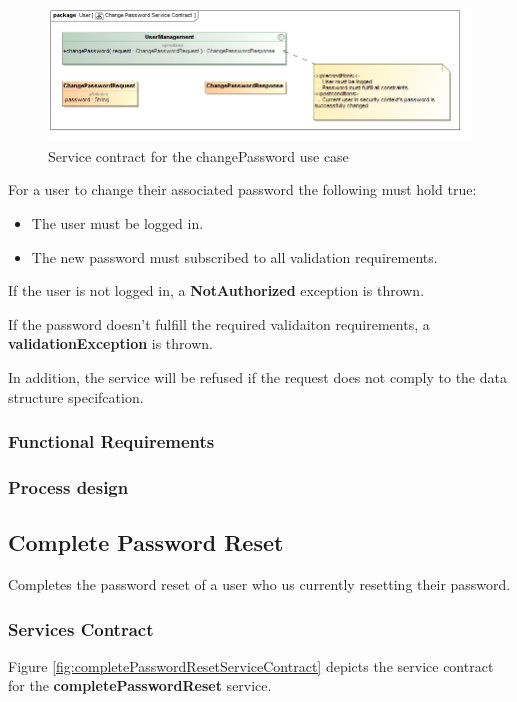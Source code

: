 \begin{figure}[H]
  \begin{center}
  \includegraphics[scale=0.55]{../Diagrams and Charts/Users/Change Password Service Contract.jpg}
  \caption{Service contract for the changePassword use case}
  \end{center}
  \label{fig:changePasswordServicesContract}
\end{figure}

For a user to change their associated password the following must hold true:
\begin{itemize}
	\item The user must be logged in.
	\item The new password must subscribed to all validation requirements.
\end{itemize}

If the user is not logged in, a \textbf{NotAuthorized} exception is thrown.

If the password doesn't fulfill the required validaiton requirements, a \textbf{validationException} is thrown.

In addition, the service will be refused if the request does not comply to the data structure specifcation.

\subsubsection{Functional Requirements}

\subsubsection{Process design}

\subsection{Complete Password Reset}
Completes the password reset of a user who us currently resetting their password.

\subsubsection{Services Contract}
Figure \ref{fig:completePasswordResetServiceContract} depicts the service contract for the \textbf{completePasswordReset} service.

